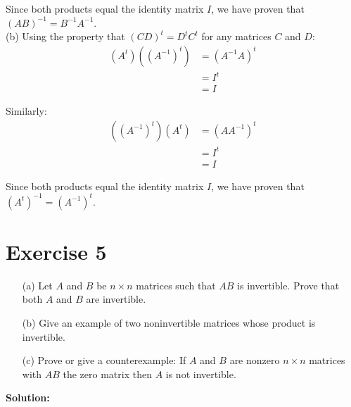 \documentclass{article}
\begin{document}
Since both products equal the identity matrix $I$, we have proven that $(AB)^{-1} = B^{-1}A^{-1}$. \\

(b)
Using the property that $(CD)^t = D^t C^t$ for any matrices $C$ and $D$:
\begin{align*}
(A^t)((A^{-1})^t) &= (A^{-1}A)^t \\
&= I^t \\
&= I
\end{align*}

Similarly:
\begin{align*}
((A^{-1})^t)(A^t) &= (AA^{-1})^t \\
&= I^t \\
&= I
\end{align*}

Since both products equal the identity matrix $I$, we have proven that $(A^t)^{-1} = (A^{-1})^t$.

\newpage

\section*{Exercise 5}
\begin{enumerate}
\item[(a)] Let $A$ and $B$ be $n \times n$ matrices such that $AB$ is invertible. Prove that both $A$ and $B$ are invertible.
\item[(b)] Give an example of two noninvertible matrices whose product is invertible.
\item[(c)] Prove or give a counterexample: If $A$ and $B$ are nonzero $n \times n$ matrices with $AB$ the zero matrix then $A$ is not invertible.
\end{enumerate}

\textbf{Solution: } \\
\end{document}
